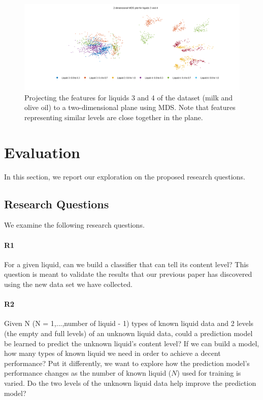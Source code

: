 \documentclass{article} %
\begin{document}
\begin{figure}[htb]
\centering
\includegraphics[width=0.8\linewidth]{mds_3_4.png}
\caption{Projecting the features for liquids 3 and 4 of the dataset (milk and olive oil) to a two-dimensional plane using MDS. Note that features representing similar levels are close together in the plane.}
\label{fig:mds}
\end{figure}

\section{Evaluation}
In this section, we report our exploration on the proposed research questions.

\subsection{Research Questions}
We examine the following research questions.

\paragraph{R1} For a given liquid, can we build a classifier that can tell its content level? This question is meant to validate the results that our previous paper has discovered using the new data set we have collected.

\paragraph{R2} Given N (N = 1,...,number of liquid - 1) types of known liquid data and 2 levels (the empty and full levels) of an unknown liquid data, could a prediction model be learned to predict the unknown liquid's content level? If we can build a model, how many types of known liquid we need in order to achieve a decent performance? Put it differently, we want to explore how the prediction model's performance changes as the number of known liquid ($N$) used for training is varied. Do the two levels of the unknown liquid data help improve the prediction model? 
\end{document}
